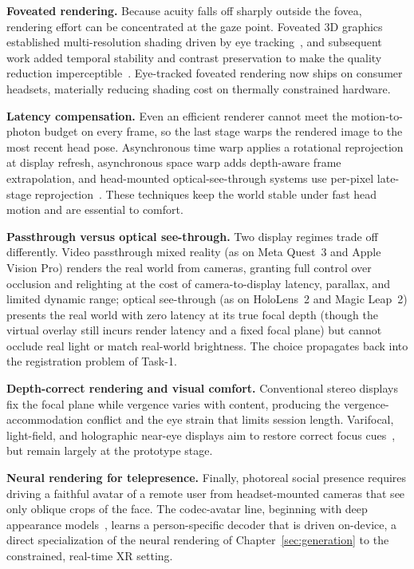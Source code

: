 \textbf{Foveated rendering.} Because acuity falls off sharply outside the fovea, rendering effort can be concentrated at the gaze point. Foveated 3D graphics established multi-resolution shading driven by eye tracking~\cite{guenter2012foveated}, and subsequent work added temporal stability and contrast preservation to make the quality reduction imperceptible~\cite{patney2016foveated}. Eye-tracked foveated rendering now ships on consumer headsets, materially reducing shading cost on thermally constrained hardware.

\textbf{Latency compensation.} Even an efficient renderer cannot meet the motion-to-photon budget on every frame, so the last stage warps the rendered image to the most recent head pose. 
Asynchronous time warp applies a rotational reprojection at display refresh, asynchronous space warp adds depth-aware frame extrapolation, and head-mounted optical-see-through systems use per-pixel late-stage reprojection~\cite{vanwaveren2016timewarp}. 
These techniques keep the world stable under fast head motion and are essential to comfort.

\textbf{Passthrough versus optical see-through.} Two display regimes trade off differently. Video passthrough mixed reality (as on Meta Quest~3 and Apple Vision Pro) renders the real world from cameras, granting full control over occlusion and relighting at the cost of camera-to-display latency, parallax, and limited dynamic range; optical see-through (as on HoloLens~2 and Magic Leap~2) presents the real world with zero latency at its true focal depth (though the virtual overlay still incurs render latency and a fixed focal plane) but cannot occlude real light or match real-world brightness. 
The choice propagates back into the registration problem of Task-1.

\textbf{Depth-correct rendering and visual comfort.} Conventional stereo displays fix the focal plane while vergence varies with content, producing the vergence-accommodation conflict and the eye strain that limits session length. 
Varifocal, light-field, and holographic near-eye displays aim to restore correct focus cues~\cite{maimone2017holographic}, but remain largely at the prototype stage.

\textbf{Neural rendering for telepresence.} Finally, photoreal social presence requires driving a faithful avatar of a remote user from headset-mounted cameras that see only oblique crops of the face. 
The codec-avatar line, beginning with deep appearance models~\cite{lombardi2018deep}, learns a person-specific decoder that is driven on-device, a direct specialization of the neural rendering of Chapter~\ref{sec:generation} to the constrained, real-time XR setting.

